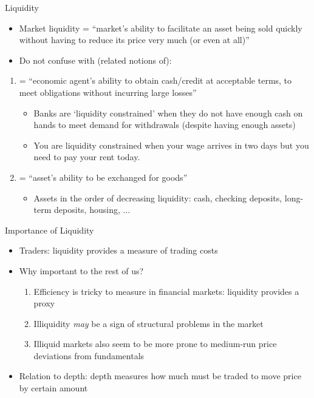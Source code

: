 \begin{frame}{Liquidity}
\begin{itemize}
	\item \alert{Market liquidity} = ``market's ability to facilitate an asset being sold quickly without having to reduce its price very much (or even at all)''
	\item Do not confuse with (related notions of):
\end{itemize}
\begin{enumerate}
	\item {} = ``economic agent's ability to obtain cash/credit at acceptable terms, to meet obligations without incurring large losses''
	\begin{itemize}
		\item Banks are `liquidity constrained' when they do not have enough cash on hands to meet demand for withdrawals (despite having enough assets)
		\item You are liquidity constrained when your wage arrives in two days but you need to pay your rent today.
	\end{itemize}
	\item {} = ``asset's ability to be exchanged for goods''
	\begin{itemize}
		\item Assets in the order of decreasing liquidity: cash, checking deposits, long-term deposits, housing, ...
	\end{itemize}
\end{enumerate}
\end{frame}


\begin{frame}{Importance of Liquidity}
\begin{itemize}
	\item Traders: liquidity provides a measure of trading costs
	\item Why important to the rest of us?
	\begin{enumerate}
		\item Efficiency is tricky to measure in financial markets: liquidity provides a proxy
		\item Illiquidity \textit{may} be a sign of structural problems in the market
		\item Illiquid markets also seem to be more prone to medium-run price deviations from fundamentals
	\end{enumerate}
	\item Relation to depth: depth measures how much must be traded to move price by certain amount
\end{itemize}
\end{frame}



